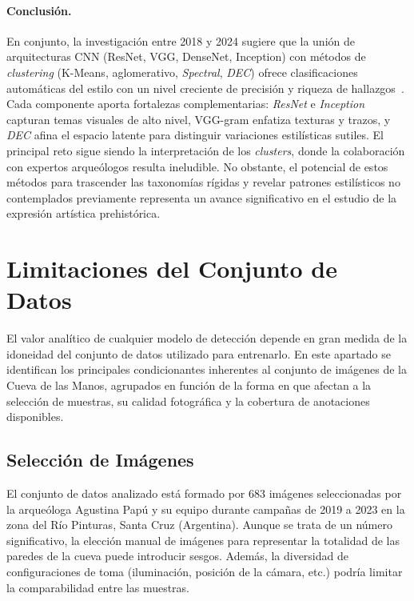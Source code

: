 \paragraph{Conclusión.}
En conjunto, la investigación entre 2018 y 2024 sugiere que la unión de arquitecturas CNN (ResNet, VGG, DenseNet, Inception) con métodos de \textit{clustering} (K-Means, aglomerativo, \textit{Spectral}, \textit{DEC}) ofrece clasificaciones automáticas del estilo con un nivel creciente de precisión y riqueza de hallazgos~\cite{parisotto2022,castellano2022,dangeti2024}.
Cada componente aporta fortalezas complementarias: \textit{ResNet} e \textit{Inception} capturan temas visuales de alto nivel, VGG-gram enfatiza texturas y trazos, y \textit{DEC} afina el espacio latente para distinguir variaciones estilísticas sutiles.
El principal reto sigue siendo la interpretación de los \textit{clusters}, donde la colaboración con expertos arqueólogos resulta ineludible. No obstante, el potencial de estos métodos para trascender las taxonomías rígidas y revelar patrones estilísticos no contemplados previamente representa un avance significativo en el estudio de la expresión artística prehistórica.

\section{Limitaciones del Conjunto de Datos}

El valor analítico de cualquier modelo de detección depende en gran medida de la idoneidad del conjunto de datos utilizado para entrenarlo.
En este apartado se identifican los principales condicionantes inherentes al conjunto de imágenes de la Cueva de las Manos, agrupados en función de la forma en que afectan a la selección de muestras, su calidad fotográfica y la cobertura de anotaciones disponibles.

\subsection{Selección de Imágenes}

El conjunto de datos analizado está formado por 683 imágenes seleccionadas por la arqueóloga Agustina Papú y su equipo durante campañas de 2019 a 2023 en la zona del Río Pinturas, Santa Cruz (Argentina).
Aunque se trata de un número significativo, la elección manual de imágenes para representar la totalidad de las paredes de la cueva puede introducir sesgos.
Además, la diversidad de configuraciones de toma (iluminación, posición de la cámara, etc.) podría limitar la comparabilidad entre las muestras.

